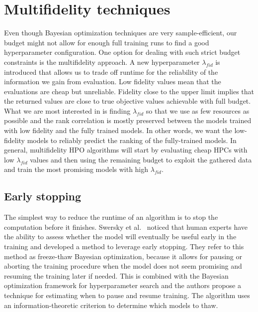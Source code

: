 \section{Multifidelity techniques}
Even though Bayesian optimization techniques are very sample-efficient, our budget might not allow for enough full training runs to find a good hyperparameter configuration. One option for dealing with such strict budget constraints is the multifidelity approach. A new hyperparameter $\lambda_{fid}$ is introduced that allows us to trade off runtime for the reliability of the information we gain from evaluation. Low fidelity values mean that the evaluations are cheap but unreliable. Fidelity close to the upper limit implies that the returned values are close to true objective values achievable with full budget. What we are most interested in is finding $\lambda_{fid}$ so that we use as few resources as possible and the rank correlation is mostly preserved between the models trained with low fidelity and the fully trained models. In other words, we want the low-fidelity models to reliably predict the ranking of the fully-trained models. In general, multifidelity HPO algorithms will start by evaluating cheap HPCs with low $\lambda_{fid}$ values and then using the remaining budget to exploit the gathered data and train the most promising models with high $\lambda_{fid}$.


\subsection{Early stopping}
The simplest way to reduce the runtime of an algorithm is to stop the computation before it finishes. Swersky et al.~\cite{swersky2014freeze} noticed that human experts have the ability to assess whether the model will eventually be useful early in the training and developed a method to leverage early stopping. They refer to this method as freeze-thaw Bayesian optimization, because it allows for pausing or aborting the training procedure when the model does not seem promising and resuming the training later if needed. This is combined with the Bayesian optimization framework for hyperparameter search and the authors propose a technique for estimating when to pause and resume training. The algorithm uses an information-theoretic criterion to determine which models to thaw.

